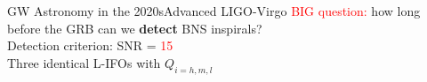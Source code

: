 \documentclass[xcolor=dvipsnames,handout,t]{beamer}
\newcommand{\red}[1]{\textcolor{red}{#1}}
\newcommand{\f}{\frac}
\begin{document}
\begin{frame}{GW Astronomy in the 2020s}{Advanced LIGO-Virgo}
  \red{BIG question:} how long before the GRB can we {\bf detect} BNS inspirals?\\
  Detection criterion: SNR = \red{15}\\
  Three identical L-IFOs with $Q_{i=h,m,l}$
 
\end{frame}
\end{document}
